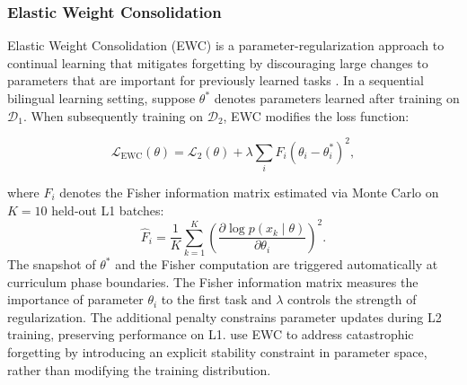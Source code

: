 \subsubsection{Elastic Weight Consolidation}

Elastic Weight Consolidation (EWC) is a parameter-regularization approach to continual learning that mitigates forgetting by discouraging large changes to parameters that are important for previously learned tasks \citep{kirkpatrick2017overcoming}.  In a sequential bilingual learning setting, suppose $\theta^*$ denotes parameters learned after training on $\mathcal{D}_1$. When subsequently training on $\mathcal{D}_2$, EWC modifies the loss function:

\[
\mathcal{L}_{\text{EWC}}(\theta)
= \mathcal{L}_{2}(\theta)
+ \lambda \sum_{i} F_i (\theta_i - \theta_i^*)^2,
\]

where $F_i$ denotes the Fisher information matrix estimated via Monte Carlo on $K\!=\!10$ held-out L1 batches:
\begin{equation}
    \hat{F}_i
    = \frac{1}{K}\sum_{k=1}^{K}
      \left(\frac{\partial\log p(x_k\mid\theta)}{\partial\theta_i}\right)^{\!2}.
    \label{eq:fisher}
\end{equation}
The snapshot of $\theta^*$ and the Fisher computation are triggered
automatically at curriculum phase boundaries. The Fisher information matrix measures the importance of parameter $\theta_i$ to the first task and $\lambda$ controls the strength of regularization. The additional penalty constrains parameter updates during L2 training, preserving performance on L1.  \citet{constantinescu2025investigating} use EWC to address catastrophic forgetting by introducing an explicit stability constraint in parameter space, rather than modifying the training distribution.

